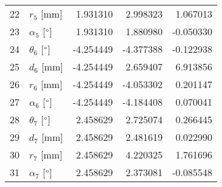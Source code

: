 \documentclass{standalone}%
\begin{document}
\begin{tabular}{llrrr}
22 &              $r_{5}$ [mm] &  1.931310 &   2.998323 &   1.067013 \\
23 &  $\alpha_{5}$ [$\degree$] &  1.931310 &   1.880980 &  -0.050330 \\
24 &  $\theta_{6}$ [$\degree$] & -4.254449 &  -4.377388 &  -0.122938 \\
25 &              $d_{6}$ [mm] & -4.254449 &   2.659407 &   6.913856 \\
26 &              $r_{6}$ [mm] & -4.254449 &  -4.053302 &   0.201147 \\
27 &  $\alpha_{6}$ [$\degree$] & -4.254449 &  -4.184408 &   0.070041 \\
28 &  $\theta_{7}$ [$\degree$] &  2.458629 &   2.725074 &   0.266445 \\
29 &              $d_{7}$ [mm] &  2.458629 &   2.481619 &   0.022990 \\
30 &              $r_{7}$ [mm] &  2.458629 &   4.220325 &   1.761696 \\
31 &  $\alpha_{7}$ [$\degree$] &  2.458629 &   2.373081 &  -0.085548 \\
\bottomrule
\end{tabular}
%
\end{document}

